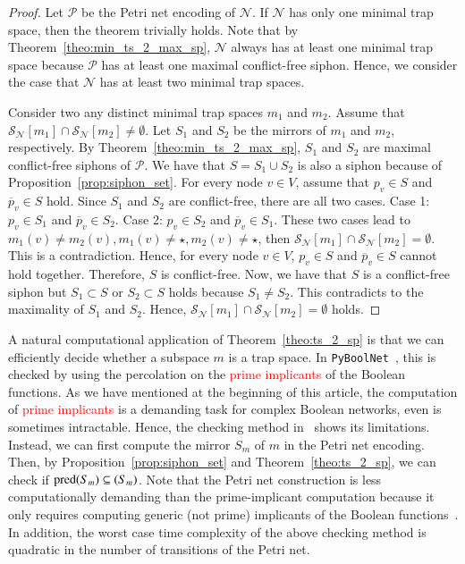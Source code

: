 \documentclass[preprint,12pt]{elsarticle}
\newcommand{\change}[1]{\textcolor{red}{#1}}
\DeclareMathOperator{\pred}{pred}
\let\succ\relax
\DeclareMathOperator{\succ}{succ}
\begin{document}
\begin{proof}

  Let \(\mathcal{P}\) be the Petri net encoding of \(\mathcal{N}\).
  If \(\mathcal{N}\) has only one minimal trap space, then the theorem trivially holds.
  Note that by Theorem~\ref{theo:min_ts_2_max_sp}, \(\mathcal{N}\) always has at least one minimal trap space because \(\mathcal{P}\) has at least one maximal conflict-free siphon.
  Hence, we consider the case that \(\mathcal{N}\) has at least two minimal trap spaces.

  Consider two any distinct minimal trap spaces \(m_1\) and \(m_2\).
  Assume that \(\mathcal{S}_{\mathcal{N}}[m_1] \cap \mathcal{S}_{\mathcal{N}}[m_2] \neq \emptyset\).
  Let \(S_1\) and \(S_2\) be the mirrors of \(m_1\) and \(m_2\), respectively.
  By Theorem~\ref{theo:min_ts_2_max_sp}, \(S_1\) and \(S_2\) are maximal conflict-free siphons of \(\mathcal{P}\).
  We have that \(S = S_1 \cup S_2\) is also a siphon because of Proposition~\ref{prop:siphon_set}.
  For every node \(v \in V\), assume that \(p_v \in S\) and \(\overline{p}_v \in S\) hold.
  Since \(S_1\) and \(S_2\) are conflict-free, there are all two cases.
  Case 1: \(p_v \in S_1\) and \(\overline{p}_v \in S_2\).
  Case 2: \(p_v \in S_2\) and \(\overline{p}_v \in S_1\).
  These two cases lead to \(m_1(v) \neq m_2(v), m_1(v) \neq \star, m_2(v) \neq \star\), then  \(\mathcal{S}_{\mathcal{N}}[m_1] \cap \mathcal{S}_{\mathcal{N}}[m_2] = \emptyset\).
  This is a contradiction.
  Hence, for every node \(v \in V\), \(p_v \in S\) and \(\overline{p}_v \in S\) cannot hold together.
  Therefore, \(S\) is conflict-free.
  Now, we have that \(S\) is a conflict-free siphon but \(S_1 \subset S\) or \(S_2 \subset S\) holds because \(S_1 \neq S_2\).
  This contradicts to the maximality of \(S_1\) and \(S_2\).
  Hence, \(\mathcal{S}_{\mathcal{N}}[m_1] \cap \mathcal{S}_{\mathcal{N}}[m_2] = \emptyset\) holds.

\end{proof}

A natural computational application of Theorem~\ref{theo:ts_2_sp} is that we can efficiently decide whether a subspace \(m\) is a trap space.
In \texttt{PyBoolNet}~\cite{klarner2017pyboolnet}, this is checked by using the percolation on the \change{prime implicants} of the Boolean functions.
As we have mentioned at the beginning of this article, the computation of \change{prime implicants} is a demanding task for complex Boolean networks, even is sometimes intractable.
Hence, the checking method in~\cite{klarner2017pyboolnet} shows its limitations.
Instead, we can first compute the mirror \(S_m\) of \(m\) in the Petri net encoding.
Then, by Proposition~\ref{prop:siphon_set} and Theorem~\ref{theo:ts_2_sp}, we can check if \(\pred(S_m) \subseteq \succ(S_m)\).
Note that the Petri net construction is less computationally demanding than the prime-implicant computation because it only requires computing generic (not prime) implicants of the Boolean functions~\cite{chatain2014characterization}.
In addition, the worst case time complexity of the above checking method is quadratic in the number of transitions of the Petri net.
\end{document}
